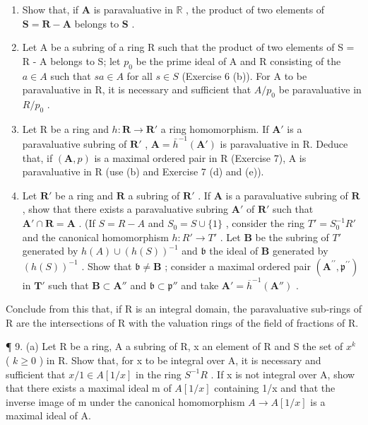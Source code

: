 \begin{enumerate}
\def\labelenumi{(\alph{enumi})}
\item
  Show that, if \(\mathbf{A}\) is paravaluative in \(\mathbb{R}\) , the product of two elements of \(\mathbf{S} = \mathbf{R} - \mathbf{A}\) belongs to \(\mathbf{S}\) .
\item
  Let A be a subring of a ring R such that the product of two elements of S = R - A belongs to S; let \(p_{0}\) be the prime ideal of A and R consisting of the \(a \in A\) such that \(sa \in A\) for all \(s \in S\) (Exercise 6 (b)). For A to be paravaluative in R, it is necessary and sufficient that \(A/p_{0}\) be paravaluative in \(R/p_{0}\) .
\item
  Let R be a ring and \(h: \mathbf{R} \to \mathbf{R}'\) a ring homomorphism. If \(\mathbf{A}'\) is a paravaluative subring of \(\mathbf{R}'\) , \(\mathbf{A} = \bar{h}^{-1}(\mathbf{A}')\) is paravaluative in R. Deduce that, if \((\mathbf{A}, p)\) is a maximal ordered pair in R (Exercise 7), A is paravaluative in R (use (b) and Exercise 7 (d) and (e)).
\item
  Let \(\mathbf{R}'\) be a ring and \(\mathbf{R}\) a subring of \(\mathbf{R}'\) . If \(\mathbf{A}\) is a paravaluative subring of \(\mathbf{R}\) , show that there exists a paravaluative subring \(\mathbf{A}'\) of \(\mathbf{R}'\) such that \(\mathbf{A}' \cap \mathbf{R} = \mathbf{A}\) . (If \(S = R - A\) and \(S_0 = S \cup \{1\}\) , consider the ring \(T' = S_0^{-1}R'\) and the canonical homomorphism \(h: R' \to T'\) . Let \(\mathbf{B}\) be the subring of \(T'\) generated by \(h(A) \cup (h(S))^{-1}\) and \(\mathfrak{b}\) the ideal of \(\mathbf{B}\) generated by \((h(S))^{-1}\) . Show that \(\mathfrak{b} \neq \mathbf{B}\) ; consider a maximal ordered pair \((\mathbf{A}^{\prime \prime}, \mathfrak{p}^{\prime \prime})\) in \(\mathbf{T}'\) such that \(\mathbf{B} \subset \mathbf{A}''\) and \(\mathfrak{b} \subset \mathfrak{p}''\) and take \(\mathbf{A}' = \overline{h}^{-1}(\mathbf{A}'')\) .
\end{enumerate}

Conclude from this that, if R is an integral domain, the paravaluative sub-rings of R are the intersections of R with the valuation rings of the field of fractions of R.

¶ 9. (a) Let R be a ring, A a subring of R, x an element of R and S the set of \(x^{k}\) ( \(k \geqslant 0\) ) in R. Show that, for x to be integral over A, it is necessary and sufficient that \(x/1 \in A[1/x]\) in the ring \(S^{-1}R\) . If x is not integral over A, show that there exists a maximal ideal m of \(A[1/x]\) containing 1/x and that the inverse image of m under the canonical homomorphism \(A \to A[1/x]\) is a maximal ideal of A.

